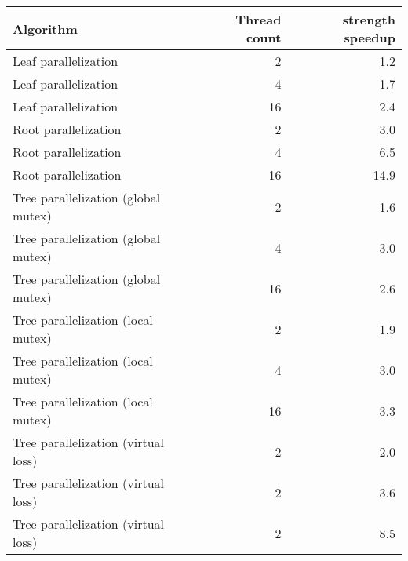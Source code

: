 \begin{table}[h]
\begin{center}
\begin{tabular}{lrr}
\hline
Algorithm & Thread count & strength speedup\\
\hline
Leaf parallelization & 2  & 1.2\\
Leaf parallelization & 4  & 1.7\\
Leaf parallelization & 16 & 2.4\\
\hline
Root parallelization & 2  & 3.0\\
Root parallelization & 4  & 6.5\\
Root parallelization & 16 & 14.9\\
\hline
Tree parallelization (global mutex) & 2  & 1.6\\
Tree parallelization (global mutex) & 4  & 3.0\\
Tree parallelization (global mutex) & 16 & 2.6\\
\hline
Tree parallelization (local mutex) & 2  & 1.9\\
Tree parallelization (local mutex) & 4  & 3.0\\
Tree parallelization (local mutex) & 16 & 3.3\\
\hline
Tree parallelization (virtual loss) & 2  & 2.0\\
Tree parallelization (virtual loss) & 2  & 3.6\\
Tree parallelization (virtual loss) & 2  & 8.5\\
\hline
\end{tabular}
\end{center}
\end{table}









